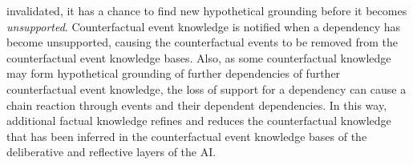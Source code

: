 invalidated, it has a chance to find new hypothetical grounding before
it becomes \emph{unsupported}.  Counterfactual event knowledge is
notified when a dependency has become unsupported, causing the
counterfactual events to be removed from the counterfactual event
knowledge bases.  Also, as some counterfactual knowledge may form
hypothetical grounding of further dependencies of further
counterfactual event knowledge, the loss of support for a dependency
can cause a chain reaction through events and their dependent
dependencies.  In this way, additional factual knowledge refines and
reduces the counterfactual knowledge that has been inferred in the
counterfactual event knowledge bases of the deliberative and
reflective layers of the AI.

